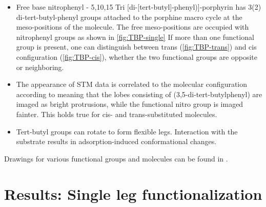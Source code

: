 \begin{itemize}
	\item Free base nitrophenyl - 5,10,15 Tri [di-[tert-butyl]-phenyl)]-porphyrin  has 3(2) di-tert-butyl-phenyl groups attached to the porphine macro cycle at the meso-positions of the molecule. The free meso-positions are occupied with nitrophenyl groups as shown in \autoref{fig:TBP-single} If more than one functional group is present, one can distinguish between trans (\autoref{fig:TBP-trans}) and cis configuration (\autoref{fig:TBP-cis}), whether the two functional groups are opposite or neighboring.
	\item The appearance of STM data is correlated to the molecular configuration according to \cite{mishra_current-driven_2015} meaning that the lobes consisting of (3,5-di-tert-butylphenyl) are imaged as bright protrusions, while the functional nitro group is imaged fainter. This holds true for cis- and trans-substituted molecules\cite{yokoyama_selective_2001}.
	\item Tert-butyl groups can rotate to form flexible legs. Interaction with the substrate results in adsorption-induced conformational changes.\cite{ecija_dynamics_2016}
\end{itemize}
Drawings for various functional groups and molecules can be found in \cite{jorgensen_salem_1973}.

\section{Results: Single leg functionalization}
